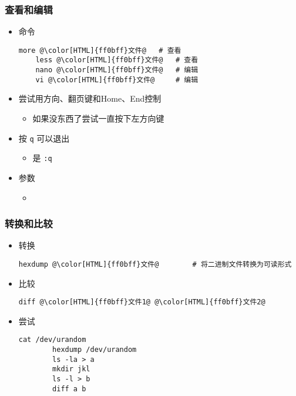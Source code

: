 \begin{CJK}{UTF8}{gbsn}
\begin{frame} [fragile]
	\frametitle{查看和编辑}
	\linespread{1.25}
	\begin{itemize}
	\item 命令
	\begin{lstlisting}[style=bashstyle, gobble=4, texcl, escapechar=@]
	more @\color[HTML]{ff0bff}文件@	# 查看
	less @\color[HTML]{ff0bff}文件@	# 查看
	nano @\color[HTML]{ff0bff}文件@	# 编辑
	vi @\color[HTML]{ff0bff}文件@		# 编辑
	\end{lstlisting}
	\item 尝试用方向、翻页键和Home、End控制
		\begin{itemize}
		\item 如果没东西了尝试一直按下左方向键
		\end{itemize}
	\item 按 \texttt{q} 可以退出
		\begin{itemize}
		\item {}是 \texttt{:q}
		\end{itemize}
	\item 参数
		\begin{itemize}
		\item {}
		\end{itemize}
	\end{itemize}
\end{frame}

\begin{frame} [fragile]
	\frametitle{转换和比较}
	\linespread{1.25}
	\begin{itemize}
	\item 转换
		\begin{lstlisting}[style=bashstyle, gobble=8, texcl, escapechar=@]
		hexdump @\color[HTML]{ff0bff}文件@		# 将二进制文件转换为可读形式
		\end{lstlisting}
	\item 比较
		\begin{lstlisting}[style=bashstyle, gobble=8, texcl, escapechar=@]
		diff @\color[HTML]{ff0bff}文件1@ @\color[HTML]{ff0bff}文件2@
		\end{lstlisting}
	\item 尝试
		\begin{lstlisting}[style=bashstyle, gobble=8, texcl, escapechar=@]
		cat /dev/urandom
		hexdump /dev/urandom
		ls -la > a
		mkdir jkl
		ls -l > b
		diff a b
		\end{lstlisting}
	\end{itemize}
\end{frame}


\end{CJK}
